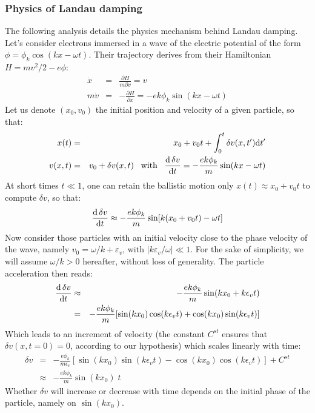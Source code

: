 \documentclass[11pt]{article}
\newcommand{\dd}{\textrm d}
\begin{document}
\subsubsection{Physics of Landau damping}

The following analysis details the physics mechanism behind Landau damping.
Let's consider electrons immersed in a wave of the electric potential of the form $\phi = \phi_k \cos(kx-\omega t)$. Their trajectory derives from their Hamiltonian $H=mv^2/2-e\phi$:
\begin{eqnarray*}
	\dot{x}   &=& \frac{\partial H}{m\partial v} = v \\
	m \dot{v} &=& - \frac{\partial H}{\partial x} = -ek\phi_k \sin(kx-\omega t)
\end{eqnarray*} 
Let us denote $(x_0,v_0)$ the initial position and velocity of a given particle, so that:
\begin{eqnarray*}
	x(t)   &=& x_0 + v_0 t + \int_0^t \delta v(x,t^\prime)\dd t^\prime \\
	v(x,t) &=& v_0 + \delta v(x,t) 
	\;\;\; \textrm{with} \;\;\;
	\frac{\dd\, \delta v}{\dd t} = - \frac{ek\phi_k}{m} \sin(kx-\omega t)
\end{eqnarray*}
At short times $t\ll1$, one can retain the ballistic motion only $x(t) \approx x_0+v_0t$ to compute $\delta v$, so that:
\begin{equation*}
\frac{\dd\, \delta v}{\dd t} \approx - \frac{ek\phi_k}{m} \sin[k(x_0 + v_0t) -\omega t]
\end{equation*}
Now consider those particles with an initial velocity close to the phase velocity of the wave, namely $v_0 = \omega/k + \varepsilon_v$, with $|k\varepsilon_v/ \omega| \ll 1$. For the sake of simplicity, we will assume $\omega/k>0$ hereafter, without loss of generality. The particle acceleration then reads:
\begin{eqnarray*}
	\frac{\dd\, \delta v}{\dd t} &\approx& - \frac{ek\phi_k}{m} \sin(kx_0 + k\epsilon_v t) \\
	&=& - \frac{ek\phi_k}{m} [\sin(kx_0) \cos(k\epsilon_vt) + \cos(kx_0) \sin(k\epsilon_vt)]
\end{eqnarray*}
Which leads to an increment of velocity (the constant $C^{st}$ ensures that $\delta v(x,t=0)=0$, according to our hypothesis) which scales linearly with time:
\begin{eqnarray*}
	\delta v &=& - \frac{e\phi_k}{m\epsilon_v} [\sin(kx_0)\sin(k\epsilon_vt) - \cos(kx_0)\cos(k\epsilon_vt)] + C^{st}\\
	&\approx& - \frac{ek\phi_k}{m} \sin(kx_0)\; t 
\end{eqnarray*}
Whether $\delta v$ will increase or decrease with time depends on the initial phase of the particle, namely on $\sin(kx_0)$. \\
\end{document}
